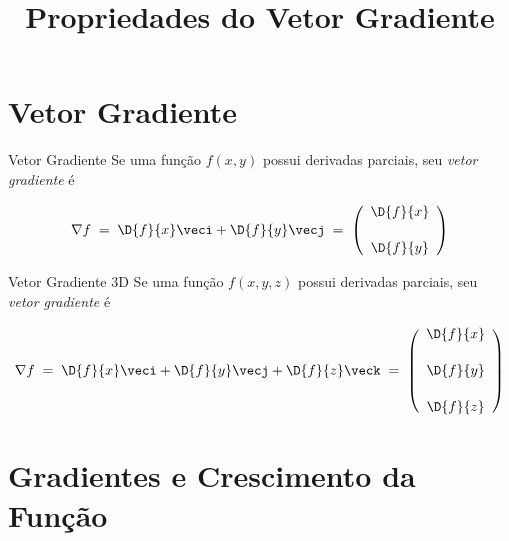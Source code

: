 
\usepackage{calculo_varias_variaveis-1}

\title{Propriedades do Vetor Gradiente}



\addtitle

\section{Vetor Gradiente}

\begin{frame}[t]{Vetor Gradiente}
  Se uma função \(f(x, y)\) possui derivadas parciais,
  seu \emph{vetor gradiente} é

  \vspace{0.99\baselineskip}
  \[
    \nabla f
    \;=\; \D{f}{x}\veci + \D{f}{y}\vecj
    \;=\; \left(\begin{array}{c}
            \displaystyle\D{f}{x} \\[5mm]
            \displaystyle\D{f}{y}
          \end{array}\right)
  \]
\end{frame}

\begin{frame}[t]{Vetor Gradiente 3D}
  Se uma função \(f(x, y, z)\) possui derivadas parciais,
  seu \emph{vetor gradiente} é

  \[
    \nabla f
    \;=\; \D{f}{x}\veci + \D{f}{y}\vecj + \D{f}{z}\veck
    \;=\; \left(\begin{array}{c}
            \displaystyle\D{f}{x} \\[5mm]
            \displaystyle\D{f}{y} \\[5mm]
            \displaystyle\D{f}{z}
          \end{array}\right)
  \]
\end{frame}

\section{Gradientes e Crescimento da Função}

